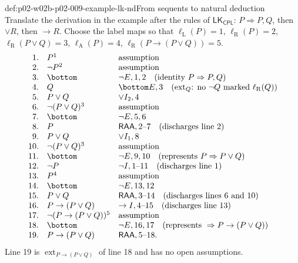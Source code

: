 \begin{hbexample}{def:p02-w02b-p02-009-example-lk-nd}{From sequents to natural deduction}
Translate the derivation in the example after the rules of
\(\mathsf{LK}_{\mathsf{CPL}}\): \(P\Rightarrow P,Q\), then \(\lor R\), then
\(\to R\).  Choose the label maps so that \(\ell_{\mathrm L}(P)=1\), \(\ell_{\mathrm R}(P)=2\),
\(\ell_{\mathrm R}(P\lor Q)=3\), \(\ell_{\mathrm A}(P)=4\),
\(\ell_{\mathrm R}(P\to(P\lor Q))=5\).
\[
\begin{array}{rll}
1.&P^{1}&\text{assumption}\\
2.&\neg P^{2}&\text{assumption}\\
3.&\bottom&\neg E,1,2\quad\text{(identity \(P\Rightarrow P,Q\))}\\
4.&Q&\bottom E,3\quad\text{(\(\operatorname{ext}_Q\): no \(\neg Q\) marked \(\ell_{\mathrm R}(Q)\))}\\
5.&P\lor Q&\lor I_2,4\\
6.&\neg(P\lor Q)^{3}&\text{assumption}\\
7.&\bottom&\neg E,5,6\\
8.&P&\mathsf{RAA},2\text{--}7\quad\text{(discharges line 2)}\\
9.&P\lor Q&\lor I_1,8\\
10.&\neg(P\lor Q)^{3}&\text{assumption}\\
11.&\bottom&\neg E,9,10\quad\text{(represents \(P\Rightarrow P\lor Q\))}\\
12.&\neg P&\neg I,1\text{--}11\quad\text{(discharges line 1)}\\
13.&P^{4}&\text{assumption}\\
14.&\bottom&\neg E,13,12\\
15.&P\lor Q&\mathsf{RAA},3\text{--}14\quad\text{(discharges lines 6 and 10)}\\
16.&P\to(P\lor Q)&\to I,4\text{--}15\quad\text{(discharges line 13)}\\
17.&\neg(P\to(P\lor Q))^{5}&\text{assumption}\\
18.&\bottom&\neg E,16,17\quad\text{(represents \({}\Rightarrow P\to(P\lor Q)\))}\\
19.&P\to(P\lor Q)&\mathsf{RAA},5\text{--}18.
\end{array}
\]
Line 19 is \(\operatorname{ext}_{P\to(P\lor Q)}\) of line 18 and has no open
assumptions.
\end{hbexample}

